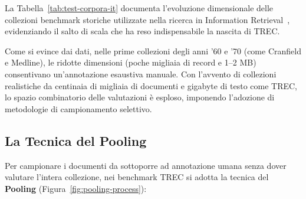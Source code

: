 La Tabella~\ref{tab:test-corpora-it} documenta l'evoluzione dimensionale delle collezioni benchmark storiche utilizzate nella ricerca in Information Retrieval~\cite{manning2008}, evidenziando il salto di scala che ha reso indispensabile la nascita di TREC.

\begin{table}[H]
\centering
{}
\caption{Panoramica comparativa dei principali corpora benchmark storici di valutazione.}
\label{tab:test-corpora-it}
\end{table}

Come si evince dai dati, nelle prime collezioni degli anni '60 e '70 (come Cranfield e Medline), le ridotte dimensioni (poche migliaia di record e 1--2 MB) consentivano un'annotazione esaustiva manuale. Con l'avvento di collezioni realistiche da centinaia di migliaia di documenti e gigabyte di testo come TREC, lo spazio combinatorio delle valutazioni è esploso, imponendo l'adozione di metodologie di campionamento selettivo.

\subsection{La Tecnica del Pooling}
Per campionare i documenti da sottoporre ad annotazione umana senza dover valutare l'intera collezione, nei benchmark TREC si adotta la tecnica del \textbf{Pooling} (Figura~\ref{fig:pooling-process}):

